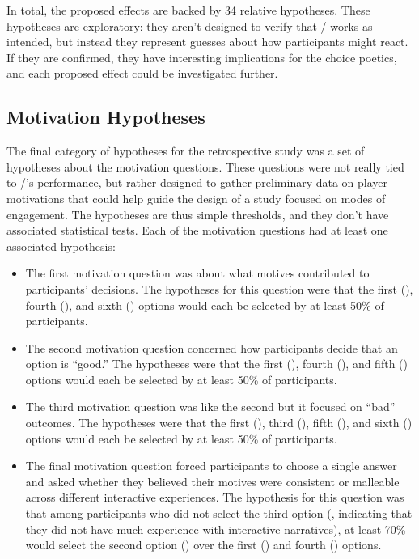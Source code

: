 In total, the proposed effects are backed by 34 relative hypotheses.
%
These hypotheses are exploratory: they aren't designed to verify that \dunyazad/ works as intended, but instead they represent guesses about how participants might react.
%
If they are confirmed, they have interesting implications for the choice poetics, and each proposed effect could be investigated further.


\subsection{Motivation Hypotheses}

The final category of hypotheses for the retrospective study was a set of hypotheses about the motivation questions.
%
These questions were not really tied to \dunyazad/'s performance, but rather designed to gather preliminary data on player motivations that could help guide the design of a study focused on modes of engagement.
%
The hypotheses are thus simple thresholds, and they don't have associated statistical tests.
%
Each of the motivation questions had at least one associated hypothesis:

\begin{itemize}
  \item The first motivation question was about what motives contributed to participants' decisions. The hypotheses for this question were that the first (), fourth (), and sixth () options would each be selected by at least 50\% of participants.
  \item The second motivation question concerned how participants decide that an option is ``good.'' The hypotheses were that the first (), fourth (), and fifth () options would each be selected by at least 50\% of participants.
  \item The third motivation question was like the second but it focused on ``bad'' outcomes. The hypotheses were that the first (), third (), fifth (), and sixth () options would each be selected by at least 50\% of participants.
  \item The final motivation question forced participants to choose a single answer and asked whether they believed their motives were consistent or malleable across different interactive experiences. The hypothesis for this question was that among participants who did not select the third option (, indicating that they did not have much experience with interactive narratives), at least 70\% would select the second option () over the first () and fourth () options.
\end{itemize}

